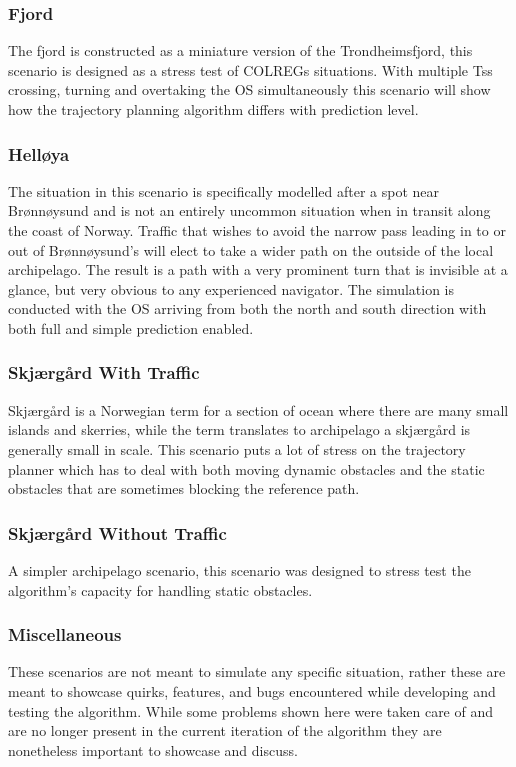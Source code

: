 \subsubsection*{Fjord}
The fjord is constructed as a miniature version of the Trondheimsfjord, this scenario is designed as a stress test of \gls{COLREGs} situations.
With multiple \gls{Ts}s crossing, turning and overtaking the \gls{OS} simultaneously this scenario will show how the trajectory planning algorithm
differs with prediction level.

\subsubsection*{Helløya}
The situation in this scenario is specifically modelled after a spot near Brønnøysund and is not an entirely uncommon
situation when in transit along the coast of Norway. Traffic that wishes to avoid the narrow pass leading in to or out of
Brønnøysund's will elect to take a wider path on the outside of the local archipelago. The result is a path with a very prominent
turn that is invisible at a glance, but very obvious to any experienced navigator. The simulation is conducted with the \gls{OS} arriving
from both the north and south direction with both full and simple prediction enabled. 

\subsubsection*{Skjærgård With Traffic}
Skjærgård is a Norwegian term for a section of ocean where there are many small islands and skerries, while the term translates to archipelago a skjærgård is generally small in scale.
This scenario puts a lot of stress on the trajectory planner which has to deal with both moving dynamic obstacles and the static obstacles that are sometimes blocking the reference path.

\subsubsection*{Skjærgård Without Traffic}
A simpler archipelago scenario, this scenario was designed to stress test the algorithm's capacity for handling static obstacles.

\subsubsection*{Miscellaneous}
These scenarios are not meant to simulate any specific situation, rather these are meant to showcase quirks, features, and bugs
encountered while developing and testing the algorithm. While some problems shown here were taken care of and are no longer present in the
current iteration of the algorithm they are nonetheless important to showcase and discuss.


